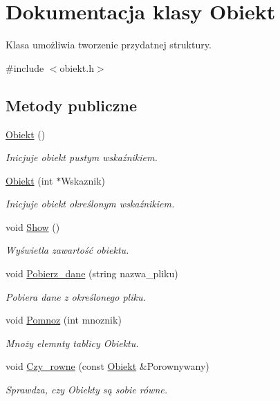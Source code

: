 \hypertarget{class_obiekt}{\section{\-Dokumentacja klasy \-Obiekt}
\label{class_obiekt}
}


\-Klasa umożliwia tworzenie przydatnej struktury.  




{\ttfamily \#include $<$obiekt.\-h$>$}

\subsection*{\-Metody publiczne}
\begin{DoxyCompactItemize}
\item 
\hyperlink{class_obiekt_ac8e27a872226e2b55c6f42c0677e5d00}{\-Obiekt} ()
\begin{DoxyCompactList}\small\item\em \-Inicjuje obiekt pustym wskaźnikiem. \end{DoxyCompactList}\item 
\hyperlink{class_obiekt_a8e2e3537c41235fe165117c3a09b9669}{\-Obiekt} (int $\ast$\-Wskaznik)
\begin{DoxyCompactList}\small\item\em \-Inicjuje obiekt określonym wskaźnikiem. \end{DoxyCompactList}\item 
void \hyperlink{class_obiekt_a59b1b7dcf398424366b132d5ae7ac087}{\-Show} ()
\begin{DoxyCompactList}\small\item\em \-Wyświetla zawartość obiektu. \end{DoxyCompactList}\item 
void \hyperlink{class_obiekt_a481091a905fc01050b9bf782502efabb}{\-Pobierz\-\_\-dane} (string nazwa\-\_\-pliku)
\begin{DoxyCompactList}\small\item\em \-Pobiera dane z określonego pliku. \end{DoxyCompactList}\item 
void \hyperlink{class_obiekt_aae43ab1926c5c6ccd82d0908c33474da}{\-Pomnoz} (int mnoznik)
\begin{DoxyCompactList}\small\item\em \-Mnoży elemnty tablicy \-Obiektu. \end{DoxyCompactList}\item 
void \hyperlink{class_obiekt_a3e8670b709172fc0a63df917f41c98cf}{\-Czy\-\_\-rowne} (const \hyperlink{class_obiekt}{\-Obiekt} \&\-Porownywany)
\begin{DoxyCompactList}\small\item\em \-Sprawdza, czy \-Obiekty są sobie równe. \end{DoxyCompactList}\end{DoxyCompactItemize}
